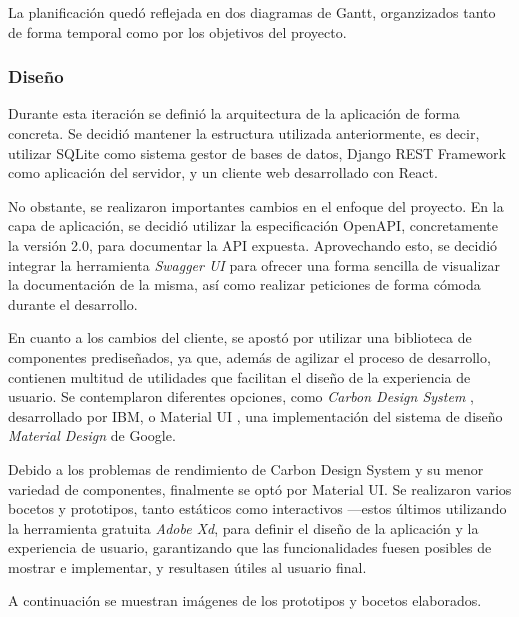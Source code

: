 \documentclass[10pt, a4paper]{aqademic}
\begin{document}
La planificación quedó reflejada en dos diagramas de Gantt, organzizados tanto de forma temporal como por los objetivos del proyecto.


\subsubsection{Diseño}

Durante esta iteración se definió la arquitectura de la aplicación de forma concreta. Se decidió mantener la estructura utilizada anteriormente, es decir, utilizar SQLite como sistema gestor de bases de datos, Django REST Framework como aplicación del servidor, y un cliente web desarrollado con React. 

No obstante, se realizaron importantes cambios en el enfoque del proyecto. En la capa de aplicación, se decidió utilizar la especificación OpenAPI, concretamente la versión 2.0, para documentar la API expuesta. Aprovechando esto, se decidió integrar la herramienta \textit{Swagger UI} para ofrecer una forma sencilla de visualizar la documentación de la misma, así como realizar peticiones de forma cómoda durante el desarrollo.

En cuanto a los cambios del cliente, se apostó por utilizar una biblioteca de componentes prediseñados, ya que, además de agilizar el proceso de desarrollo, contienen multitud de utilidades que facilitan el diseño de la experiencia de usuario. Se contemplaron diferentes opciones, como \textit{Carbon Design System} \cite{noauthor_carbon_nodate}, desarrollado por IBM, o Material UI \cite{noauthor_material-ui:_nodate}, una implementación del sistema de diseño \textit{Material Design} \cite{noauthor_material_nodate} de Google. 

Debido a los problemas de rendimiento de Carbon Design System y su menor variedad de componentes, finalmente se optó por Material UI. Se realizaron varios bocetos y prototipos, tanto estáticos como interactivos ---estos últimos utilizando la herramienta gratuita \textit{Adobe Xd}, para definir el diseño de la aplicación y la experiencia de usuario, garantizando que las funcionalidades fuesen posibles de mostrar e implementar, y resultasen útiles al usuario final.

A continuación se muestran imágenes de los prototipos y bocetos elaborados.
\end{document}
